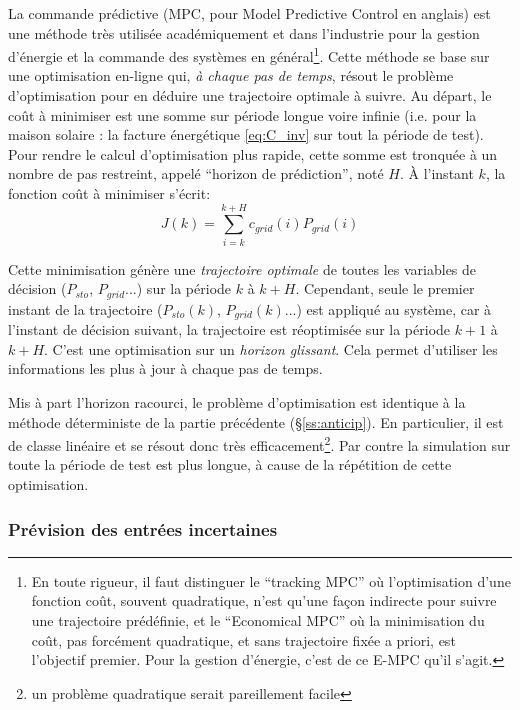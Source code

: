 \documentclass[a4paper,10pt,twocolumn]{article}
\begin{document}
La commande prédictive (MPC, pour Model Predictive Control en anglais)
est une méthode très utilisée académiquement et dans l'industrie
pour la gestion d'énergie et la commande des systèmes en général\footnote{
  En toute rigueur, il faut distinguer le
  ``tracking MPC'' où l'optimisation d'une fonction coût, souvent quadratique,
  n'est qu'une façon indirecte pour suivre une trajectoire prédéfinie,
  et le ``Economical MPC'' où la minimisation du coût, pas forcément quadratique,
  et sans trajectoire fixée a priori, est l'objectif premier.
  Pour la gestion d'énergie, c'est de ce E-MPC qu'il s'agit.}.
Cette méthode se base sur une optimisation en-ligne qui, \emph{à chaque pas de temps},
résout le problème d'optimisation pour en déduire une trajectoire optimale à suivre.
Au départ, le coût à minimiser est  une somme sur période longue voire infinie
(i.e. pour la maison solaire : la facture énergétique \eqref{eq:C_inv}
sur tout la période de test). Pour rendre le calcul d'optimisation plus rapide,
cette somme est tronquée à un nombre de pas restreint,
appelé ``horizon de prédiction'', noté $H$.
À l'instant $k$, la fonction coût à minimiser s'écrit:
%
\begin{equation} \label{eq:mpc_cost}
  J(k) = \sum_{i=k}^{k+H} c_{grid}(i)P_{grid}(i)
\end{equation} 

Cette minimisation génère une \emph{trajectoire optimale}
de toutes les variables de décision ($P_{sto}$, $P_{grid}$...)
sur la période $k$ à $k+H$.
Cependant, seule le premier instant de la trajectoire ($P_{sto}(k)$, $P_{grid}(k)$...)
est appliqué au système, car à l'instant de décision suivant,
la trajectoire est réoptimisée sur la période $k+1$ à $k+H$.
C'est une optimisation sur un \emph{horizon glissant}.
Cela permet d'utiliser les informations les plus à jour à chaque pas de temps.

Mis à part l'horizon racourci, le problème d'optimisation
est identique à la méthode déterministe de la partie précédente (§\ref{ss:anticip}).
En particulier, il est de classe linéaire et se résout donc très efficacement\footnote{
  un problème quadratique serait pareillement facile}.
Par contre la simulation sur toute la période de test est plus longue,
à cause de la répétition de cette optimisation.

\subsubsection{Prévision des entrées incertaines}
\end{document}
